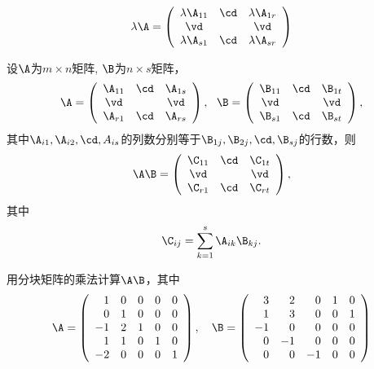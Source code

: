 \begin{frame}\ft{\secname}

\begin{dingyi}[分块矩阵的数乘]
  $$
  \lambda \A = \left(
    \begin{array}{ccc}
      \lambda \A_{11} & \cd & \lambda \A_{1r} \\
      \vd   &     & \vd   \\
      \lambda \A_{s1} & \cd & \lambda \A_{sr}
    \end{array}
  \right)
  $$    
\end{dingyi}
\end{frame}

\begin{frame}\ft{\secname}

\begin{dingyi}[分块矩阵的乘法]
  设$\A$为$m\times n$矩阵, $\B$为$n \times s$矩阵，
  $$
  \A = \left(
    \begin{array}{ccc}
      \A_{11} & \cd & \A_{1s} \\
      \vd   &     & \vd   \\
      \A_{r1} & \cd & \A_{rs}
    \end{array}
  \right), \ \ 
  \B = \left(
    \begin{array}{ccc}
      \B_{11} & \cd & \B_{1t} \\
      \vd   &     & \vd   \\
      \B_{s1} & \cd & \B_{st}
    \end{array}
  \right),
  $$
  其中\textcolor{acolor3}{$\A_{i1}, \A_{i2}, \cd, A_{is}$的列数分别等于$\B_{1j}, \B_{2j}, \cd, \B_{sj}$的行数}，则
  $$
  \A \B = \left(
    \begin{array}{ccc}
      \C_{11}   & \cd & \C_{1t}  \\
      \vd   &     & \vd   \\
      \C_{r1}   & \cd & \C_{rt}
    \end{array}
  \right),
  $$
  其中
  $$
  \C_{ij} = \sum_{k=1}^s \A_{ik} \B_{kj}.
  $$
\end{dingyi}
\end{frame}

\begin{frame}\ft{\secname}


\begin{li} 
  用分块矩阵的乘法计算$\A\B$，其中
  $$
  \A = \left(
    \begin{array}{rrrrr}
      1&0&0&0&0\\
      0&1&0&0&0\\
      -1&2&1&0&0\\
      1&1&0&1&0\\
      -2&0&0&0&1
    \end{array}
  \right), \quad
  \B = \left(
    \begin{array}{rrrrr}
      3&2&0&1&0\\
      1&3&0&0&1\\
      -1&0&0&0&0\\
      0&-1&0&0&0\\
      0&0&-1&0&0
    \end{array}
  \right)
  $$
\end{li}
\end{frame}

